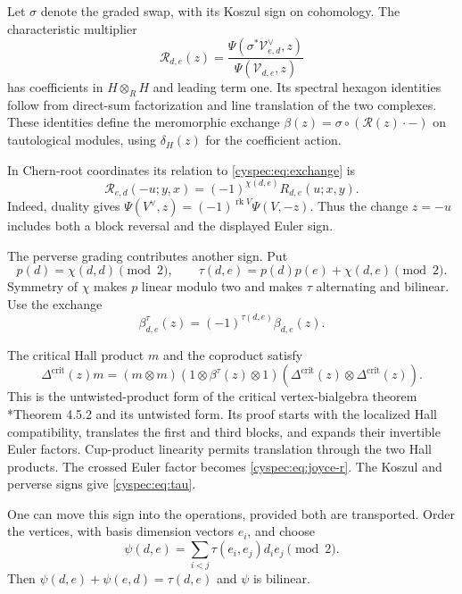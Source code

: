 Let $\sigma$ denote the graded swap, with its Koszul sign on
cohomology. The characteristic multiplier
\begin{equation}\label{cyspec:eq:joyce-r}
 \mathscr R_{d,e}(z)=
 \frac{\Psi(\sigma^*\mathcal V_{e,d}^{\vee},z)}
      {\Psi(\mathcal V_{d,e},z)}
\end{equation}
has coefficients in $H\otimes_R H$ and leading term one.
Its spectral hexagon identities follow from direct-sum factorization
and line translation of the two complexes.
These identities define the meromorphic exchange
$\beta(z)=\sigma\circ(\mathscr R(z)\cdot-)$ on tautological modules,
using $\delta_H(z)$ for the coefficient action.

In Chern-root coordinates its relation to
\eqref{cyspec:eq:exchange} is
\begin{equation}\label{cyspec:eq:exchange-conventions}
 \mathscr R_{e,d}(-u;y,x)=(-1)^{\chi(d,e)}R_{d,e}(u;x,y).
\end{equation}
Indeed, duality gives $\Psi(V^\vee,z)=(-1)^{\operatorname{rk}V}
\Psi(V,-z)$. Thus the change $z=-u$ includes both a block reversal
and the displayed Euler sign.

The perverse grading contributes another sign. Put
\begin{equation}\label{cyspec:eq:tau}
 p(d)=\chi(d,d)\pmod2,\qquad
 \tau(d,e)=p(d)p(e)+\chi(d,e)\pmod2.
\end{equation}
Symmetry of $\chi$ makes $p$ linear modulo two and makes $\tau$
alternating and bilinear. Use the exchange
\[
 \beta^\tau_{d,e}(z)=(-1)^{\tau(d,e)}\beta_{d,e}(z).
\]

The critical Hall product $m$ and the coproduct satisfy
\begin{equation}\label{cyspec:eq:critical-bialgebra}
 \Delta^{\mathrm{crit}}(z)m
 =(m\otimes m)(1\otimes\beta^\tau(z)\otimes1)
        (\Delta^{\mathrm{crit}}(z)\otimes\Delta^{\mathrm{crit}}(z)).
\end{equation}
This is the untwisted-product form of the critical vertex-bialgebra
theorem \cite{cyspec:JKL}*{Theorem 4.5.2 and its untwisted form}.
Its proof starts with the localized Hall compatibility, translates
the first and third blocks, and expands their invertible Euler
factors. Cup-product linearity permits translation through the two
Hall products. The crossed Euler factor becomes
\eqref{cyspec:eq:joyce-r}. The Koszul and perverse signs give
\eqref{cyspec:eq:tau}.

One can move this sign into the operations, provided both are
transported. Order the vertices, with basis dimension vectors $e_i$,
and choose
\[
 \psi(d,e)=\sum_{i<j}\tau(e_i,e_j)d_i e_j\pmod2.
\]
Then $\psi(d,e)+\psi(e,d)=\tau(d,e)$ and $\psi$ is bilinear.

